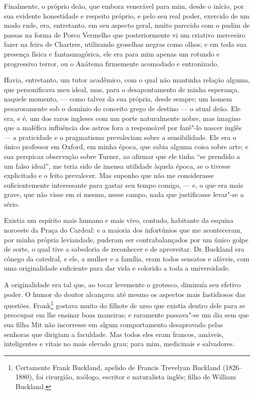 Finalmente, o próprio deão, que embora venerável para mim, desde o
início, por sua evidente honestidade e respeito próprio, e pelo seu real
poder, exercido de um modo rude, era, entretanto, em seu aspecto geral,
muito parecido com o pudim de passas na forma de Porco Vermelho que
posteriormente vi um criativo merceeiro fazer na feira de Chartres,
utilizando groselhas negras como olhos; e em toda sua presença física e
fantasmagórica, ele era para mim apenas um rotundo e progressivo terror,
ou o Anátema firmemente acomodado e entronizado.

Havia, entretanto, um tutor acadêmico, com o qual não mantinha relação
alguma, que personificava meu ideal, mas, para o desapontamento de minha
esperança, naquele momento, --- como talvez da sua própria, desde sempre;
um homem pesarosamente sob o domínio do conceito grego de
destino  --- o atual deão. Ele era, e é, um dos raros ingleses com um
porte naturalmente nobre, mas imagino que a maléfica influência dos
astros fora a responsável por fazê"-lo nascer inglês --- a praticidade e o
pragmatismo prevaleciam sobre a sensibilidade. Ele era o único professor
em Oxford, em minha época, que sabia alguma coisa sobre arte; e sua
perspicaz observação sobre Turner, ao afirmar que ele tinha ``se
prendido a um falso ideal'', me teria sido de imensa utilidade àquela
época, se o tivesse explicitado e o feito prevalecer. Mas suponho que
não me considerasse suficientemente interessante para gastar seu tempo
comigo, --- e, o que era mais grave, que não visse em si mesmo, nesse
campo, nada que justificasse levar"-se a sério.

Existia um espírito mais humano e mais vivo, contudo, habitante da
esquina noroeste da Praça do Cardeal: e a maioria dos infortúnios que me
aconteceram, por minha própria leviandade, puderam ser contrabalançados
por um único golpe de sorte, o qual tive a sabedoria de reconhecer e de
aproveitar. Dr.\,Buckland era cônego da catedral, e ele, a mulher e a
família, eram todos sensatos e afáveis, com uma originalidade suficiente
para dar vida e colorido a toda a universidade.

A originalidade era tal que, ao tocar levemente o grotesco, diminuía seu
efetivo poder. O humor do doutor alcançava até mesmo os aspectos mais
fastidiosos das questões. Frank\footnote{Certamente Frank Buckland, apelido de Francis Trevelyan Buckland (1826--1880), foi cirurgião, zoólogo, escritor
  e naturalista inglês; filho de William Buckland.}
gostava muito do filhote de urso que existia dentro dele para se
preocupar em lhe ensinar boas maneiras; e raramente passava"-se um dia
sem que sua filha Mit não incorresse em algum comportamento desaprovado
pelas senhoras que dirigiam a faculdade. Mas todos eles eram francos,
amáveis, inteligentes e vitais no mais elevado grau; para mim,
medicinais e salvadores.

